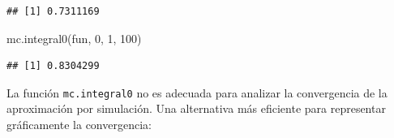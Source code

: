 \documentclass[
]{book}
\newenvironment{Shaded}{\begin{snugshade}}{\end{snugshade}}
\newcommand{\DecValTok}[1]{\textcolor[rgb]{0.00,0.00,0.81}{#1}}
\newcommand{\FunctionTok}[1]{\textcolor[rgb]{0.00,0.00,0.00}{#1}}
\newcommand{\NormalTok}[1]{#1}
\theoremstyle{break}
\theoremstyle{definition}
\theoremstyle{definition}
\theoremstyle{definition}
\theoremstyle{definition}
\theoremstyle{remark}
\begin{document}
\begin{verbatim}
## [1] 0.7311169
\end{verbatim}

\begin{Shaded}
\begin{Highlighting}[]
\FunctionTok{mc.integral0}\NormalTok{(fun, }\DecValTok{0}\NormalTok{, }\DecValTok{1}\NormalTok{, }\DecValTok{100}\NormalTok{)}
\end{Highlighting}
\end{Shaded}

\begin{verbatim}
## [1] 0.8304299
\end{verbatim}

La función \texttt{mc.integral0} no es adecuada para analizar la convergencia
de la aproximación por simulación.
Una alternativa más eficiente para representar gráficamente la convergencia:
\end{document}
